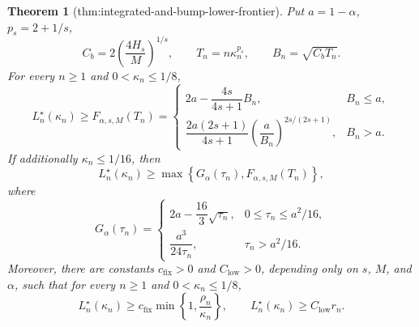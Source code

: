 \documentclass{article}
\newtheorem{theorem}{Theorem}
\begin{document}
\begin{theorem}[thm:integrated-and-bump-lower-frontier]\label{thm:integrated-and-bump-lower-frontier}
Put \(a=1-\alpha\), \(p_s=2+1/s\),
\[
 C_b=2\left(\frac{4H_s}{M}\right)^{1/s},
 \qquad T_n=n\kappa_n^{p_s},
 \qquad B_n=\sqrt{C_bT_n}.
\]
For every \(n\ge1\) and \(0<\kappa_n\le1/8\),
\[
 L_n^\star(\kappa_n)\ge F_{\alpha,s,M}(T_n)
 =\begin{cases}
 2a-\dfrac{4s}{4s+1}B_n,&B_n\le a,\\[6pt]
 \dfrac{2a(2s+1)}{4s+1}
 \left(\dfrac{a}{B_n}\right)^{2s/(2s+1)},&B_n>a.
 \end{cases}
\]
If additionally \(\kappa_n\le1/16\), then
\[
 L_n^\star(\kappa_n)
 \ge\max\left\{G_\alpha(\tau_n),F_{\alpha,s,M}(T_n)\right\},
\]
where
\[
 G_\alpha(\tau_n)
 =\begin{cases}
 2a-\dfrac{16}{3}\sqrt{\tau_n},
   &0\le\tau_n\le a^2/16,\\[6pt]
 \dfrac{a^3}{24\tau_n},&\tau_n>a^2/16.
 \end{cases}
\]
Moreover, there are constants \(c_{\mathrm{fix}}>0\) and
\(C_{\mathrm{low}}>0\), depending only on \(s\), \(M\), and
\(\alpha\), such that for every \(n\ge1\) and
\(0<\kappa_n\le1/8\),
\[
 L_n^\star(\kappa_n)
 \ge c_{\mathrm{fix}}\min\left\{1,\frac{\rho_n}{\kappa_n}\right\},
 \qquad
 L_n^\star(\kappa_n)\ge C_{\mathrm{low}}r_n.
\]
\end{theorem}
\end{document}
